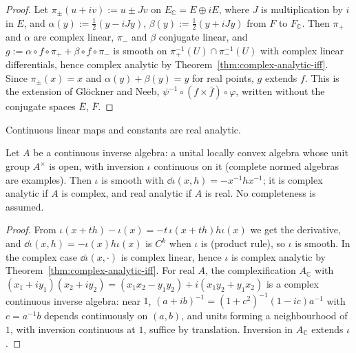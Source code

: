 \begin{proof}
  \leanok
  Let $\pi_\pm(u + iv) := u \pm J v$ on $E_{\mathbb{C}} = E \oplus iE$, where $J$ is
  multiplication by $i$ in $E$, and $\alpha(y) := \frac12 (y - i J y)$,
  $\beta(y) := \frac12 (y + i J y)$ from $F$ to $F_{\mathbb{C}}$. Then $\pi_+$ and $\alpha$ are
  complex linear, $\pi_-$ and $\beta$ conjugate linear, and
  $g := \alpha \circ f \circ \pi_+ + \beta \circ f \circ \pi_-$ is smooth on
  $\pi_+^{-1}(U) \cap \pi_-^{-1}(U)$ with complex linear differentials, hence complex analytic
  by Theorem~\ref{thm:complex-analytic-iff}. Since $\pi_\pm(x) = x$ and
  $\alpha(y) + \beta(y) = y$ for real points, $g$ extends $f$. This is the extension of Glöckner
  and Neeb, $\psi^{-1} \circ (f \times \bar f) \circ \varphi$, written without the conjugate
  spaces $\bar E$, $\bar F$.
\end{proof}

Continuous linear maps and constants are real analytic.

\begin{theorem}
  \label{thm:cia-inversion}
  \leanok
  Let $A$ be a continuous inverse algebra: a unital locally convex algebra whose unit group $A^\times$
  is open, with inversion $\iota$ continuous on it (complete normed algebras are examples). Then
  $\iota$ is smooth with $\dd\iota(x, h) = -x^{-1} h x^{-1}$; it is complex analytic if $A$ is
  complex, and real analytic if $A$ is real. No completeness is assumed.
\end{theorem}

\begin{proof}
  \leanok
  From $\iota(x + th) - \iota(x) = -t\, \iota(x + th) h \iota(x)$ we get the derivative, and
  $\dd\iota(x, h) = -\iota(x) h \iota(x)$ is $C^k$ when $\iota$ is (product rule), so $\iota$ is smooth.
  In the complex case $\dd\iota(x, \cdot)$ is complex linear, hence $\iota$ is complex analytic by
  Theorem~\ref{thm:complex-analytic-iff}. For real $A$, the complexification $A_{\mathbb{C}}$ with
  $(x_1 + iy_1)(x_2 + iy_2) = (x_1x_2 - y_1y_2) + i(x_1y_2 + y_1x_2)$ is a complex continuous
  inverse algebra: near $1$, $(a + ib)^{-1} = (1 + c^2)^{-1}(1 - ic)a^{-1}$ with $c = a^{-1}b$
  depends continuously on $(a, b)$, and units forming a neighbourhood of $1$, with inversion
  continuous at $1$, suffice by translation. Inversion in $A_{\mathbb{C}}$ extends $\iota$.
\end{proof}


